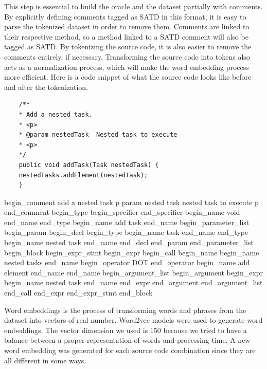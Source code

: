 This step is essential to build the oracle and the dataset partially with comments. By explicitly defining comments tagged as SATD in this format, it is easy to parse the tokenized dataset in order to remove them. Comments are linked to their respective method, so a method linked to a SATD comment will also be tagged as SATD. By tokenizing the source code, it is also easier to remove the comments entirely, if necessary. Transforming the source code into tokens also acts as a normalization process, which will make the word embedding process more efficient. Here is a code snippet of what the source code looks like before and after the tokenization.

\newpage

\begin{mdframed}
	\begin{lstlisting}
	/**
	* Add a nested task.
	* <p>
	* @param nestedTask  Nested task to execute
	* <p>
	*/
	public void addTask(Task nestedTask) {
	nestedTasks.addElement(nestedTask);
	}
	\end{lstlisting}
\end{mdframed}

\begin{mdframed}
	\begin{center}
		 begin\_comment add a nested task p param nested task nested task to execute p end\_comment  begin\_type  begin\_specifier  end\_specifier  begin\_name void  end\_name  end\_type  begin\_name add task  end\_name  begin\_parameter\_list  begin\_param  begin\_decl  begin\_type  begin\_name task  end\_name  end\_type  begin\_name nested task  end\_name  end\_decl  end\_param  end\_parameter\_list  begin\_block  begin\_expr\_stmt  begin\_expr  begin\_call  begin\_name  begin\_name nested tasks  end\_name  begin\_operator DOT  end\_operator  begin\_name add element  end\_name  end\_name  begin\_argument\_list  begin\_argument  begin\_expr  begin\_name nested task  end\_name  end\_expr  end\_argument  end\_argument\_list  end\_call  end\_expr  end\_expr\_stmt  end\_block 
	\end{center}
\end{mdframed}

Word embeddings is the process of transforming words and phrases from the dataset into vectors of real number. Word2vec models were used to generate word embeddings. The vector dimension we used is 150 because we tried to have a balance between a proper representation of words and processing time. A new word embedding was generated for each source code combination since they are all different in some ways.

